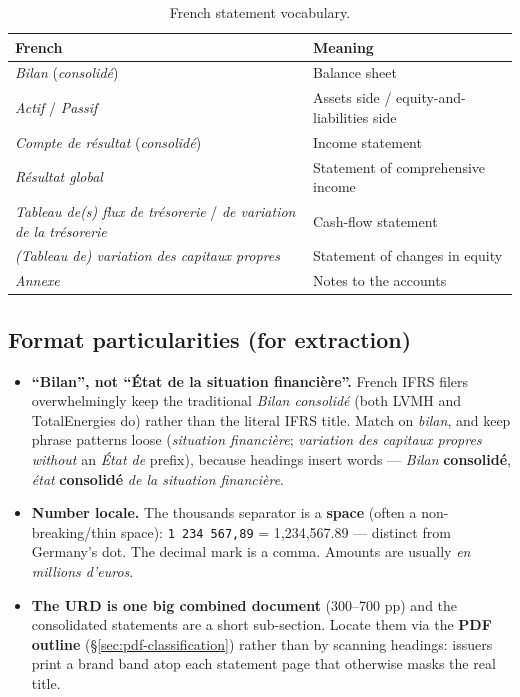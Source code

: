 \documentclass[11pt,a4paper]{report}
\begin{document}
\begin{table}[h]
\centering
\caption{French statement vocabulary.}
\label{tab:fr-vocab}
\small
\begin{tabular}{@{}p{}p{}@{}}
\toprule
\textbf{French} & \textbf{Meaning} \\
\midrule
\emph{Bilan} (\emph{consolidé}) & Balance sheet \\
\emph{Actif} / \emph{Passif} & Assets side / equity-and-liabilities side \\
\emph{Compte de résultat} (\emph{consolidé}) & Income statement \\
\emph{Résultat global} & Statement of comprehensive income \\
\emph{Tableau de(s) flux de trésorerie} / \emph{de variation de la trésorerie} & Cash-flow statement \\
\emph{(Tableau de) variation des capitaux propres} & Statement of changes in equity \\
\emph{Annexe} & Notes to the accounts \\
\bottomrule
\end{tabular}
\end{table}

\subsection{Format particularities (for extraction)}

\begin{itemize}
  \item \textbf{``Bilan'', not ``État de la situation financière''.} French IFRS filers overwhelmingly keep
    the traditional \emph{Bilan consolidé} (both LVMH and TotalEnergies do) rather than the literal IFRS
    title. Match on \emph{bilan}, and keep phrase patterns loose (\emph{situation financière};
    \emph{variation des capitaux propres} \emph{without} an \emph{État de} prefix), because headings insert
    words --- \emph{Bilan} \textbf{consolidé}, \emph{état} \textbf{consolidé} \emph{de la situation
    financière}.
  \item \textbf{Number locale.} The thousands separator is a \textbf{space} (often a non-breaking/thin
    space): \texttt{1 234 567,89} = 1{,}234{,}567.89 --- distinct from Germany's dot. The decimal mark is a
    comma. Amounts are usually \emph{en millions d'euros}.
  \item \textbf{The URD is one big combined document} (300--700 pp) and the consolidated statements are a
    short sub-section. Locate them via the \textbf{PDF outline} (§\ref{sec:pdf-classification}) rather than
    by scanning headings: issuers print a brand band atop each statement page that otherwise masks the real
    title.
\end{itemize}
\end{document}
